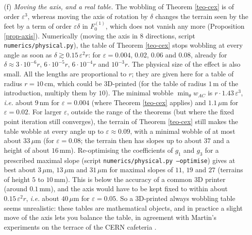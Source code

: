 \documentclass[a4paper,11pt,twoside,leqno]{article}
\newcommand{\ie}[0]{\emph{i.e.} }
\newcommand{\eps}[0]{\varepsilon}
\numberwithin{equation}{section}
\begin{document}
\begin{rmk}
(f) \emph{Moving the axis, and a real table.} The wobbling of Theorem \ref{teo-cex} is of order $\eps^3$, whereas moving the axis of rotation by $\delta$ changes the terrain seen by the feet by a term of order $\eps\delta$ in $F_0^{(1)}$, which does not vanish any more (Proposition \ref{prop-axis}). Numerically (moving the axis in $8$ directions, script \texttt{numerics/physical.py}), the table of Theorem \ref{teo-cex} stops wobbling at every angle as soon as $\delta \gtrsim 0.15\, \eps^2 r$: for $\eps = 0.004$, $0.02$, $0.06$ and $0.08$, already for $\delta \approx 3 \cdot 10^{-6} r$, $6\cdot 10^{-5} r$, $6 \cdot 10^{-4} r$ and $10^{-3} r$. The physical size of the effect is also small. All the lengths are proportional to $r$; they are given here for a table of radius $r = 10$\,cm, which could be 3D-printed (for the table of radius $1$\,m of the introduction, multiply them by $10$). The minimal wobble $\min_\theta w_{AC}$ is $r \cdot 1.43\,\eps^3$, \ie about $9$\,nm for $\eps = 0.004$ (where Theorem \ref{teo-cex} applies) and $1.1\,\mu$m for $\eps = 0.02$. For larger $\eps$, outside the range of the theorems (but where the fixed point iteration still converges), the terrain of Theorem \ref{teo-cex} still makes the table wobble at every angle up to $\eps \approx 0.09$, with a minimal wobble of at most about $33\,\mu$m (for $\eps = 0.08$; the terrain then has slopes up to about $37$\textdegree{} and a height of about $16$\,mm). Re-optimising the coefficients of $g_1$ and $g_3$ for a prescribed maximal slope (script \texttt{numerics/physical.py --optimise}) gives at best about $3\,\mu$m, $13\,\mu$m and $31\,\mu$m for maximal slopes of $11$\textdegree{}, $19$\textdegree{} and $27$\textdegree{} (terrains of height $5$ to $10$\,mm). This is below the accuracy of a common 3D printer (around $0.1$\,mm), and the axis would have to be kept fixed to within about $0.15\,\eps^2 r$, \ie about $40\,\mu$m for $\eps = 0.05$. So a 3D-printed always wobbling table seems unrealistic: these tables are mathematical objects, and in practice a slight move of the axis lets you balance the table, in agreement with Martin's experiments on the terrace of the CERN cafeteria \cite[\S{}1]{Mar}.


\end{rmk}
\end{document}
